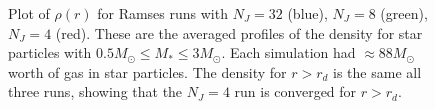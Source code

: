 \documentclass[../dissertation.tex]{subfiles}
\begin{document}
\begin{figure}[htb]
\caption[Hydro Average run of density for sink particles $0.5 - 3.0 \Msun$]{Plot of $\rho(r)$ for Ramses runs with $N_J = 32$ (blue), $N_J = 8$ (green), $N_J = 4$ (red). These are the averaged profiles of the density for star particles with $0.5M_\odot\leq M_*\leq 3 M_\odot$. Each simulation had $\approx 88 M_\odot$ worth of gas in star particles. The density for $r>r_d$ is the same all three runs, showing that the $N_J=4$ run is converged for $r>r_d$. \label{fig:hydro_density_convergence}}
\end{figure}
\end{document}
